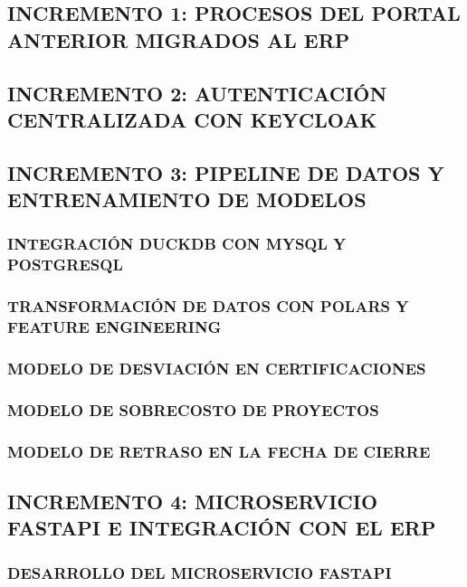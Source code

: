 
\subsection{INCREMENTO 1: PROCESOS DEL PORTAL ANTERIOR MIGRADOS AL ERP}

\subsection{INCREMENTO 2: AUTENTICACIÓN CENTRALIZADA CON KEYCLOAK}

\subsection{INCREMENTO 3: PIPELINE DE DATOS Y ENTRENAMIENTO DE MODELOS}
\subsubsection{INTEGRACIÓN DUCKDB CON MYSQL Y POSTGRESQL}
\subsubsection{TRANSFORMACIÓN DE DATOS CON POLARS Y FEATURE ENGINEERING}
\subsubsection{MODELO DE DESVIACIÓN EN CERTIFICACIONES}
\subsubsection{MODELO DE SOBRECOSTO DE PROYECTOS}
\subsubsection{MODELO DE RETRASO EN LA FECHA DE CIERRE}

\subsection{INCREMENTO 4: MICROSERVICIO FASTAPI E INTEGRACIÓN CON EL ERP}
\subsubsection{DESARROLLO DEL MICROSERVICIO FASTAPI}
